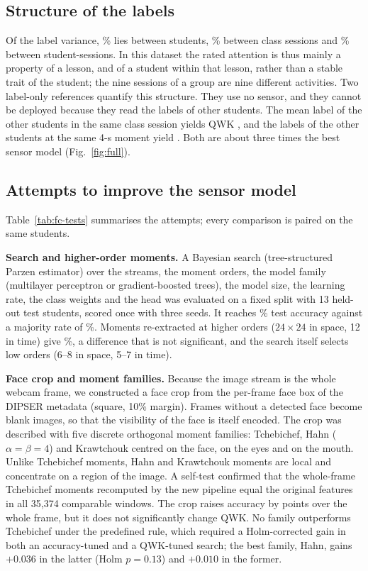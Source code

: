 \subsection{Structure of the labels}
\label{sec:fc-labels}
Of the label variance, \fcSharePerson\% lies between students, \fcShareClass\% between class sessions and \fcShareSession\% between student-sessions. In this dataset the rated attention is thus mainly a property of a lesson, and of a student within that lesson, rather than a stable trait of the student; the nine sessions of a group are nine different activities. Two label-only references quantify this structure. They use no sensor, and they cannot be deployed because they read the labels of other students. The mean label of the other students in the same class session yields QWK \fcExpPrior, and the labels of the other students at the same 4-s moment yield \fcMomentPrior. Both are about three times the best sensor model (Fig.~\ref{fig:full}).

\subsection{Attempts to improve the sensor model}
\label{sec:fc-limits}
Table~\ref{tab:fc-tests} summarises the attempts; every comparison is paired on the same students.

\textbf{Search and higher-order moments.} A Bayesian search (tree-structured Parzen estimator) over the streams, the moment orders, the model family (multilayer perceptron or gradient-boosted trees), the model size, the learning rate, the class weights and the head was evaluated on a fixed split with 13 held-out test students, scored once with three seeds. It reaches \fcSearchPaperAcc\% test accuracy against a majority rate of \fcSearchMajority\%. Moments re-extracted at higher orders ($24\times24$ in space, 12 in time) give \fcSearchRichAcc\%, a difference that is not significant, and the search itself selects low orders (6--8 in space, 5--7 in time).

\textbf{Face crop and moment families.}
\label{sec:fc-crop}
Because the image stream is the whole webcam frame, we constructed a face crop from the per-frame face box of the DIPSER metadata (square, 10\% margin). Frames without a detected face become blank images, so that the visibility of the face is itself encoded. The crop was described with five discrete orthogonal moment families: Tchebichef, Hahn ($\alpha=\beta=4$) and Krawtchouk centred on the face, on the eyes and on the mouth. Unlike Tchebichef moments, Hahn and Krawtchouk moments are local and concentrate on a region of the image. A self-test confirmed that the whole-frame Tchebichef moments recomputed by the new pipeline equal the original features in all 35{,}374 comparable windows. The crop raises accuracy by \fcCropAccGain{} points \fcCropAccCI{} over the whole frame, but it does not significantly change QWK. No family outperforms Tchebichef under the predefined rule, which required a Holm-corrected gain in both an accuracy-tuned and a QWK-tuned search; the best family, Hahn, gains $+0.036$ in the latter (Holm $p=0.13$) and $+0.010$ in the former.

